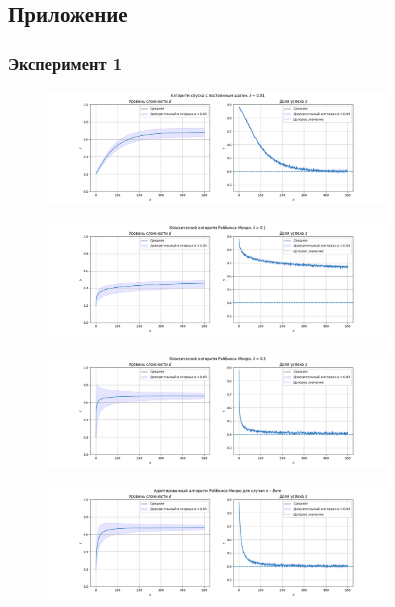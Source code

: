 \pagebreak

\subsection{Приложение}

\subsubsection{Эксперимент 1}
\begin{figure}[h!]
    \centering
    \includegraphics[width=0.8\textwidth]{assets/work/rating/1/fixed.png}
    \label{exp1:fixed}
\end{figure}
\begin{figure}[h!]
    \centering
    \includegraphics[width=0.8\textwidth]{assets/work/rating/1/lambda_0.1.png}
    \label{exp1:lambda_0.1}
\end{figure}
\begin{figure}[h!]
    \centering
    \includegraphics[width=0.8\textwidth]{assets/work/rating/1/lambda_0.5.png}
    \label{exp1:lambda_0.5}
\end{figure}
\begin{figure}[h!]
    \centering
    \includegraphics[width=0.8\textwidth]{assets/work/rating/1/adaptive.png}
    \label{exp1:adaptive}
\end{figure}
\pagebreak
